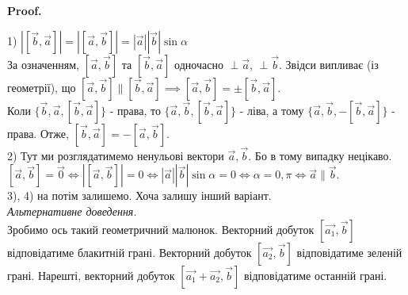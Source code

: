 \documentclass[a4paper, 10pt]{extarticle}
\makeatletter
\def\qed{$\blacksquare$}
\def\qed{$\blacksquare$}
\theoremstyle{theoremdd}
\theoremstyle{theoremdd}
\theoremstyle{theoremdd}
\theoremstyle{theoremdd}
\theoremstyle{theoremdd}
\theoremstyle{theoremdd}
\theoremstyle{theoremdd}
\theoremstyle{theoremdd}
\renewenvironment{proof}[1][Proof.\\]{\par
\pushQED{\hfill \qed}%
\normalfont \topsep6\p@\@plus6\p@\relax
\trivlist
\item\relax
{\bfseries
#1\@addpunct{.}}\hspace\labelsep\ignorespaces
}{%
\popQED\endtrivlist\@endpefalse
}
\makeatother
\begin{document}
\begin{proof}
1) $|[\vec{b}, \vec{a}]| = |[\vec{a}, \vec{b}]| = |\vec{a}| |\vec{b}| \sin \alpha$\\
За означенням, $[\vec{a}, \vec{b}]$ та $[\vec{b}, \vec{a}]$ одночасно $\perp \vec{a}$, $\perp \vec{b}$. Звідси випливає (із геометрії), що
$[\vec{a}, \vec{b}] \parallel [\vec{b}, \vec{a}] \implies [\vec{a}, \vec{b}] = \pm [\vec{b}, \vec{a}]$.\\
Коли $\{\vec{b}, \vec{a}, [\vec{b}, \vec{a}]\}$ - права, то $\{\vec{a}, \vec{b}, [\vec{b}, \vec{a}]\}$ - ліва, а тому $\{\vec{a}, \vec{b}, -[\vec{b}, \vec{a}]\}$ - права. Отже, $[\vec{b},\vec{a}] = -[\vec{a}, \vec{b}]$.
\bigskip \\
2) Тут ми розглядатимемо ненульові вектори $\vec{a},\vec{b}$. Бо в тому випадку нецікаво.\\
$[\vec{a}, \vec{b}] = \vec{0} \iff |[\vec{a}, \vec{b}]| = 0 \iff |\vec{a}| |\vec{b}| \sin \alpha = 0 \iff \alpha = 0,\pi \iff \vec{a} \parallel \vec{b}$.
\bigskip \\
3), 4) на потім залишемо. Хоча залишу інший варіант.\\
\textit{Альтернативне доведення.}\\
Зробимо ось такий геометричний малюнок. Векторний добуток $[\vec{a_1},\vec{b}]$ відповідатиме блакитній грані. Векторний добуток $[\vec{a_2},\vec{b}]$ відповідатиме зеленій грані. Нарешті, векторний добуток $[\vec{a_1}+\vec{a_2}, \vec{b}]$ відповідатиме останній грані.
\begin{figure}[H]
\centering
{}
\end{figure}
\end{proof}
\end{document}
